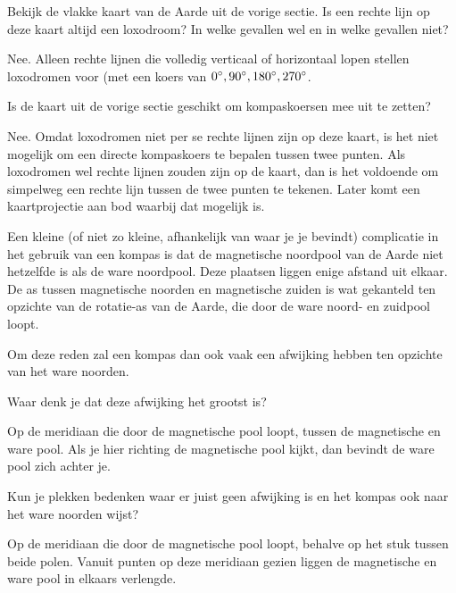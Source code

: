 \begin{opgave}[\ster]
	\begin{subopgave}
		Bekijk de vlakke kaart van de Aarde uit de vorige sectie. Is een rechte lijn op deze kaart altijd een loxodroom? In welke gevallen wel en in welke gevallen niet?
		\begin{antwoord}
			Nee. Alleen rechte lijnen die volledig verticaal of horizontaal lopen stellen loxodromen voor (met een koers van $0\degree, 90\degree, 180\degree, 270\degree$. 
		\end{antwoord}
	\end{subopgave}
	\begin{subopgave}
		Is de kaart uit de vorige sectie geschikt om kompaskoersen mee uit te zetten?
		\begin{antwoord}
			Nee. Omdat loxodromen niet per se rechte lijnen zijn op deze kaart, is het niet mogelijk om een directe kompaskoers te bepalen tussen twee punten. Als loxodromen wel rechte lijnen zouden zijn op de kaart, dan is het voldoende om simpelweg een rechte lijn tussen de twee punten te tekenen. Later komt een kaartprojectie aan bod waarbij dat mogelijk is.
		\end{antwoord}
	\end{subopgave}
\end{opgave}
	
Een kleine (of niet zo kleine, afhankelijk van waar je je bevindt) complicatie in het gebruik van een kompas is dat de magnetische noordpool van de Aarde niet hetzelfde is als de ware noordpool. Deze plaatsen liggen enige afstand uit elkaar. De as tussen magnetische noorden en magnetische zuiden is wat gekanteld ten opzichte van de rotatie-as van de Aarde, die door de ware noord- en zuidpool loopt.

Om deze reden zal een kompas dan ook vaak een afwijking hebben ten opzichte van het ware noorden.

\begin{opgave}
	\begin{subopgave}
		Waar denk je dat deze afwijking het grootst is?
		\begin{antwoord}
			Op de meridiaan die door de magnetische pool loopt, tussen de magnetische en ware pool. Als je hier richting de magnetische pool kijkt, dan bevindt de ware pool zich achter je.
		\end{antwoord}
	\end{subopgave}
	\begin{subopgave}
		Kun je plekken bedenken waar er juist geen afwijking is en het kompas ook naar het ware noorden wijst?
		\begin{antwoord}
			Op de meridiaan die door de magnetische pool loopt, behalve op het stuk tussen beide polen. Vanuit punten op deze meridiaan gezien liggen de magnetische en ware pool in elkaars verlengde.
		\end{antwoord}
	\end{subopgave}	
\end{opgave}

